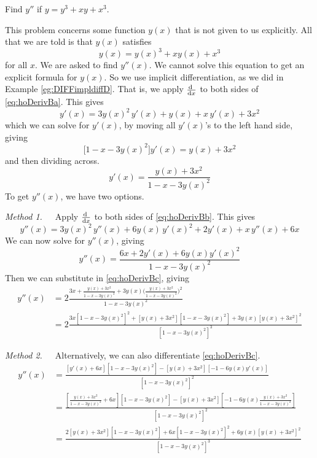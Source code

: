 \begin{eg}\label{eg:higherOrdDerivC}
Find $y''$ if $y=y^3+xy+x^3$.

\soln This problem concerns some function $y(x)$ that is not
given to us explicitly. All that we are told is that $y(x)$ satisfies
\begin{equation}\label{eq:hoDerivBa}
y(x)=y(x)^3+xy(x)+x^3
\end{equation}
for all $x$. We are asked to find $y''(x)$. We cannot solve this
equation to get an explicit formula for $y(x)$.  So we use implicit
differentiation, as we did in Example \ref{eg:DIFFimpldiffD}. That is, we apply
$\diff{}{x}$ to both sides of \eqref{eq:hoDerivBa}. This gives
\begin{equation}\label{eq:hoDerivBb}
y'(x)=3y(x)^2\,y'(x)+y(x)+x\,y'(x)+3x^2
\end{equation}
which we can solve for $y'(x)$, by moving all $y'(x)$'s to the left hand
side, giving
\begin{equation*}
 \big[1-x-3y(x)^2\big]y'(x) = y(x)+3x^2
\end{equation*}
and then dividing across.
\begin{equation}\label{eq:hoDerivBc}
y'(x) = \frac{y(x)+3x^2}{1-x-3y(x)^2}
\end{equation}
To get $y''(x)$, we have two options.

\noindent\emph{Method 1.}\ \ \  Apply $\diff{}{x}$ to both sides of
\eqref{eq:hoDerivBb}.
This gives
\begin{equation*}
y''(x)=3y(x)^2\,y''(x)+6y(x)\,y'(x)^2+2y'(x)+x\,y''(x)+6x
\end{equation*}
We can now solve for $y''(x)$, giving
\begin{equation}\label{eq:hoDerivBd}
y''(x) = \frac{6x+2y'(x)+6y(x)y'(x)^2}{1-x-3y(x)^2}
\end{equation}
Then we can substitute in \eqref{eq:hoDerivBc}, giving
\begin{align*}
y''(x) &= 2\frac{3x+ \frac{y(x)+3x^2}{1-x-3y(x)^2}
              +3y(x) \big(\frac{y(x)+3x^2}{1-x-3y(x)^2}\big)^2}
         {1-x-3y(x)^2} \\
&= 2\frac{3x{[1-x-3y(x)^2]}^2+ [y(x)+3x^2][1-x-3y(x)^2]
              +3y(x) {[y(x)+3x^2]}^2}{{[1-x-3y(x)^2]}^3}
\end{align*}

\noindent\emph{Method 2.}\ \ \  Alternatively, we can also differentiate
\eqref{eq:hoDerivBc}.
\begin{align*}
y''(x) &= \frac{[y'(x)+6x][1-x-3y(x)^2]-
           [y(x)+3x^2][-1-6y(x)y'(x)]}{{[1-x-3y(x)^2]}^2} \\[0.05in]
&= \frac{[\frac{y(x)+3x^2}{1-x-3y(x)^2}+6x][1-x-3y(x)^2]-
           [y(x)+3x^2][-1-6y(x)\frac{y(x)+3x^2}{1-x-3y(x)^2}]}
                                       {{[1-x-3y(x)^2]}^2}\\[0.05in]
&= \frac{2[y(x)+3x^2][1-x-3y(x)^2]+6x{[1-x-3y(x)^2]}^2
           +6y(x){[y(x)+3x^2]}^2}
                                       {{[1-x-3y(x)^2]}^3}
\end{align*}


\end{eg}
